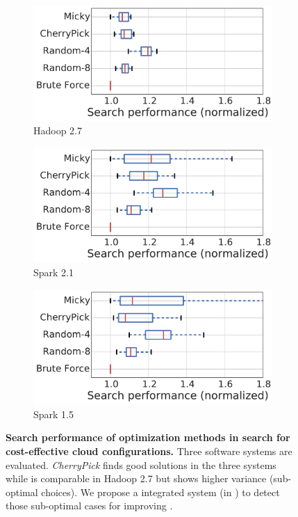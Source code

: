 \begin{figure}[!htbp]
\centering
\begin{subfigure}[b]{0.6\textwidth}
    \includegraphics[width=\linewidth]{Figures/s2_single_hadoop_cost_performance.pdf}
    \caption{Hadoop 2.7}
    \label{fig:single_time_steps}
\end{subfigure}
\begin{subfigure}[b]{0.6\textwidth}
    \includegraphics[width=\linewidth]{Figures/s2_single_spark_cost_performance.pdf}
    \caption{Spark 2.1}
    \label{fig:single_time_performance}
\end{subfigure}
\begin{subfigure}[b]{0.6\textwidth}
    \includegraphics[width=\linewidth]{Figures/s2_single_spark15_cost_performance.pdf}
    \caption{Spark 1.5}
    \label{fig:single_time_performance}
\end{subfigure}
\caption{\small{\textbf{Search performance of optimization methods in search for cost-effective cloud configurations.} Three software systems are evaluated.  \emph{CherryPick} finds good solutions in the three systems while \micky is comparable in Hadoop 2.7 but shows higher variance (sub-optimal choices).  We propose a integrated system (in \myfigure{\ref{fig:system_design}}) to detect those sub-optimal cases for improving \micky.}}
\label{fig:s2_cost_performance}
\end{figure}



